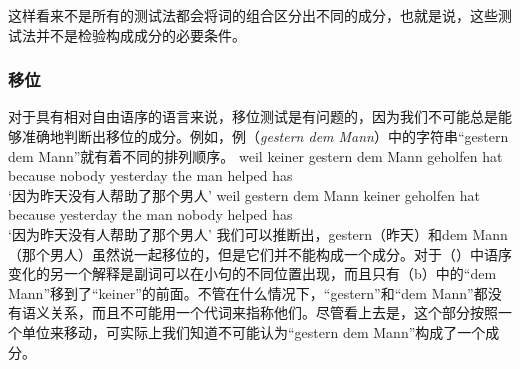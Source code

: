 这样看来不是所有的测试法都会将词的组合区分出不同的成分，也就是说，这些测试法并不是检验构成成分的必要条件。

\subsubsection{移位}
对于具有相对自由语序的语言来说，移位测试是有问题的，因为我们不可能总是能够准确地判断出移位的成分。例如，例（\emph{gestern dem Mann}）中的字符串“gestern dem Mann”就有着不同的排列顺序。
\eal
\ex 
\gll weil keiner gestern dem Mann geholfen hat\\
     because nobody yesterday the man helped has\\
\glt `因为昨天没有人帮助了那个男人'
\ex 
\gll weil gestern dem Mann keiner geholfen hat\\
	 because yesterday the man nobody helped has\\
\glt `因为昨天没有人帮助了那个男人'
\zl
我们可以推断出，gestern（昨天）和dem Mann（那个男人）虽然说一起移位的，但是它们并不能构成一个成分。对于（）中语序变化的另一个解释是副词可以在小句的不同位置出现，而且只有（b）中的“dem Mann”移到了“keiner”的前面。不管在什么情况下，“gestern”和“dem Mann”都没有语义关系，而且不可能用一个代词来指称他们。尽管看上去是，这个部分按照一个单位来移动，可实际上我们知道不可能认为“gestern dem Mann”构成了一个成分。

